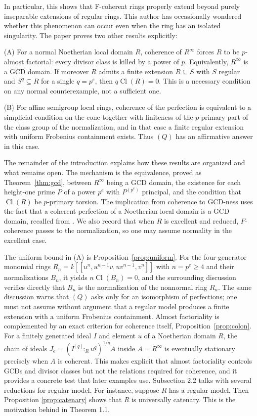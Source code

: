 \documentclass[11pt,a4paper]{amsart}
\numberwithin{equation}{section}
\newcommand{\Cl}{\operatorname{Cl}}
\begin{document}
In particular, this shows that  F-coherent rings properly extend beyond purely inseparable extensions of regular rings. This author has occasionally wondered whether this phenomenon can occur even when the ring has an isolated singularity.
The paper proves two other results explicitly:

(A)
	For a normal Noetherian local domain $R$, coherence of $R^\infty$
	forces $R$ to be $p$-almost factorial: every divisor class is killed
	by a power of $p$.
	Equivalently, $R^\infty$ is a GCD domain. If moreover $R$ admits a
	finite extension $R\subseteq S$ with $S$ regular and
	$S^q\subseteq R$ for a single $q=p^e$, then $q\Cl(R)=0$. This is a necessary condition on any
	normal counterexample, not a sufficient one.
	
(B)
	For affine semigroup local rings, coherence of the perfection is
	equivalent to a simplicial condition on the cone together with
	finiteness of the $p$-primary part of the class group of the
	normalization, and in that case a finite regular extension with uniform
	Frobenius containment exists. Thus $(Q)$ has an
	affirmative answer in this case.
	



The remainder of the introduction explains how these results are
organized and what remains open.
The mechanism is the equivalence,
proved as Theorem~\ref{thm:gcd}, between $R^\infty$ being a GCD domain,
the existence for each height-one prime $P$ of a power $p^e$ with
$P^{(p^e)}$ principal, and the condition that $\Cl(R)$ be
$p$-primary torsion. The implication from coherence to GCD-ness uses
the fact that a coherent perfection of a Noetherian local domain is a
GCD domain, recalled from \cite[Section~2]{Simpson}. We also record that
when $R$ is excellent and reduced, $F$-coherence passes to the
normalization, so one may assume normality in the excellent case.

The uniform bound in (A) is Proposition~\ref{prop:uniform}. For the
four-generator monomial rings
$R_n=k[[u^n,u^{n-1}v,uv^{n-1},v^n]]$ with $n=p^e\geq4$ and their
normalizations $B_n$, it yields $n\Cl(B_n)=0$, and the surrounding
discussion verifies directly that $B_n$ is the normalization of the
nonnormal ring $R_n$. The same discussion warns that $(Q)$ asks
only for an isomorphism of perfections; one must not assume without
argument that a regular model produces a finite extension with a
uniform Frobenius containment. Almost factoriality is complemented by an exact criterion for coherence
itself, Proposition~\ref{prop:colon}. For a finitely generated ideal
$I$ and element $u$ of a Noetherian domain $R$, the chain of
ideals $J_e=(I^{[q]}:_R u^q)^{1/q}A$ inside $A=R^\infty$ is
eventually stationary precisely when $A$ is coherent. This makes
explicit that almost factoriality controls GCDs and divisor classes but
not the relations required for coherence, and it provides a concrete
test that later examples use.
Subsection 2.2 talks with several reductions for regular model.
For instance, suppose $R$ has a regular model. Then Proposition \ref{prop:catenary}
shows that
	$R$ is universally catenary.
 This is the motivation behind in Theorem 1.1.
\end{document}
